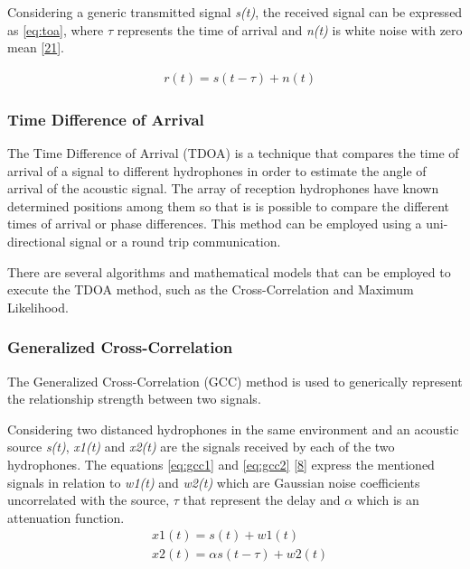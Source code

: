 Considering a generic transmitted signal \textit{s(t)}, the received signal can be expressed as \ref{eq:toa}, where $\tau$ represents the time of arrival and \textit{n(t)} is white noise with zero mean [\hyperref[r:r21]{21}]. 

\begin{eqnarray}
& r(t) = s(t - \tau) + n(t)
\label{eq:toa}
\end{eqnarray}

\subsubsection{Time Difference of Arrival}

The Time Difference of Arrival (TDOA) is a technique that compares the time of arrival of a signal to different hydrophones in order to estimate the angle of arrival of the acoustic signal. The array of reception hydrophones have known determined positions among them so that is is possible to compare the different times of arrival or phase differences. This method can be employed using a uni-directional signal or a round trip communication.

There are several algorithms and mathematical models that can be employed to execute the TDOA method, such as the Cross-Correlation and Maximum Likelihood.

\subsubsection{Generalized Cross-Correlation}

The Generalized Cross-Correlation (GCC) method is used to generically represent the relationship strength between two signals.

Considering two distanced hydrophones in the same environment and an acoustic source \textit{s(t)}, \textit{x1(t)} and \textit{x2(t)} are the signals received by each of the two hydrophones. The equations \ref{eq:gcc1} and \ref{eq:gcc2}  [\hyperref[r:crosscorr]{8}] express the mentioned signals in relation to \textit{w1(t)} and \textit{w2(t)} which are Gaussian noise coefficients uncorrelated with the source, $\tau$ that represent the delay and $\alpha$ which is an attenuation function.
\begin{eqnarray}
&x1(t) = s(t) + w1(t)
\label{eq:gcc1}\\
&x2(t) = \alpha s(t - \tau) + w2(t)
\label{eq:gcc2}\\
\end{eqnarray}


